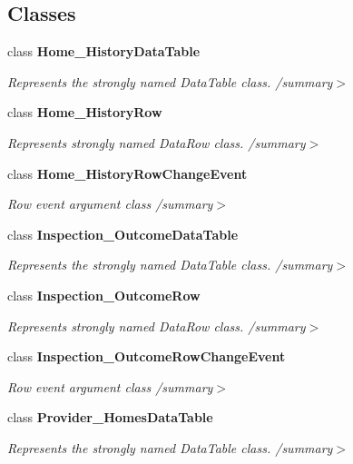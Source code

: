 \subsection*{Classes}
\begin{DoxyCompactItemize}
\item 
class \textbf{ Home\+\_\+\+History\+Data\+Table}
\begin{DoxyCompactList}\small\item\em Represents the strongly named Data\+Table class. /summary$>$ \end{DoxyCompactList}\item 
class \textbf{ Home\+\_\+\+History\+Row}
\begin{DoxyCompactList}\small\item\em Represents strongly named Data\+Row class. /summary$>$ \end{DoxyCompactList}\item 
class \textbf{ Home\+\_\+\+History\+Row\+Change\+Event}
\begin{DoxyCompactList}\small\item\em Row event argument class /summary$>$ \end{DoxyCompactList}\item 
class \textbf{ Inspection\+\_\+\+Outcome\+Data\+Table}
\begin{DoxyCompactList}\small\item\em Represents the strongly named Data\+Table class. /summary$>$ \end{DoxyCompactList}\item 
class \textbf{ Inspection\+\_\+\+Outcome\+Row}
\begin{DoxyCompactList}\small\item\em Represents strongly named Data\+Row class. /summary$>$ \end{DoxyCompactList}\item 
class \textbf{ Inspection\+\_\+\+Outcome\+Row\+Change\+Event}
\begin{DoxyCompactList}\small\item\em Row event argument class /summary$>$ \end{DoxyCompactList}\item 
class \textbf{ Provider\+\_\+\+Homes\+Data\+Table}
\begin{DoxyCompactList}\small\item\em Represents the strongly named Data\+Table class. /summary$>$ \end{DoxyCompactList}\item 

\end{DoxyCompactItemize}

